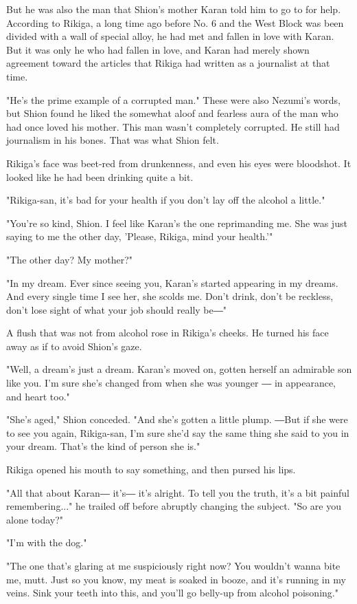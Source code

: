 But he was also the man that Shion's mother Karan told him to go to for
help. According to Rikiga, a long time ago before No. 6 and the West
Block was been divided with a wall of special alloy, he had met and
fallen in love with Karan. But it was only he who had fallen in love,
and Karan had merely shown agreement toward the articles that Rikiga had
written as a journalist at that time.

"He's the prime example of a corrupted man." These were also Nezumi's
words, but Shion found he liked the somewhat aloof and fearless aura of
the man who had once loved his mother. This man wasn't completely
corrupted. He still had journalism in his bones. That was what Shion
felt.

Rikiga's face was beet-red from drunkenness, and even his eyes were
bloodshot. It looked like he had been drinking quite a bit.

"Rikiga-san, it's bad for your health if you don't lay off the alcohol a
little."

"You're so kind, Shion. I feel like Karan's the one reprimanding me. She
was just saying to me the other day, 'Please, Rikiga, mind your
health.'"

"The other day? My mother?"

"In my dream. Ever since seeing you, Karan's started appearing in my
dreams. And every single time I see her, she scolds me. Don't drink,
don't be reckless, don't lose sight of what your job should really be―"

A flush that was not from alcohol rose in Rikiga's cheeks. He turned his
face away as if to avoid Shion's gaze.

"Well, a dream's just a dream. Karan's moved on, gotten herself an
admirable son like you. I'm sure she's changed from when she was younger
― in appearance, and heart too."

"She's aged," Shion conceded. "And she's gotten a little plump. ―But if
she were to see you again, Rikiga-san, I'm sure she'd say the same thing
she said to you in your dream. That's the kind of person she is."

Rikiga opened his mouth to say something, and then pursed his lips.

"All that about Karan― it's― it's alright. To tell you the truth, it's a
bit painful remembering..." he trailed off before abruptly changing the
subject. "So are you alone today?"

"I'm with the dog."

"The one that's glaring at me suspiciously right now? You wouldn't wanna
bite me, mutt. Just so you know, my meat is soaked in booze, and it's
running in my veins. Sink your teeth into this, and you'll go belly-up
from alcohol poisoning."

